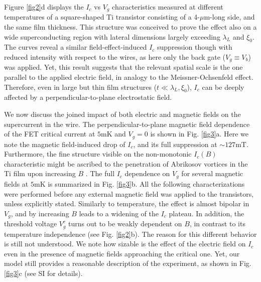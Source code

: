 \documentclass[prl,twocolumn,reprint,graphicx,showpacs,superscriptaddress,floatfix]{revtex4-1}
\begin{document}
Figure \ref{fig2}d displays the $I_c$ vs  $V_g$ characteristics measured at different  temperatures of
a square-shaped Ti transistor consisting of a 4-$\mu$m-long side, and the same film thickness. 
This structure was conceived to prove the effect also on a wide superconducting region with lateral dimensions largely exceeding $\lambda_L$ and $\xi_0$. 
The curves  reveal a similar field-effect-induced $I_c$ suppression though with reduced intensity with respect to the wires, as here only the back gate ($V_g \equiv V_b$) was applied.
Yet, this result suggests that 
the relevant spatial scale is the one parallel to the applied electric field, in analogy to the Meissner-Ochsenfeld effect. 
Therefore, even in large but thin film structures ($t\ll \lambda _L,\xi_0$), $I_c$ can be deeply affected by a perpendicular-to-plane electrostatic field.

We now discuss the joined impact of both electric and magnetic fields on the supercurrent in the wire.
The perpendicular-to-plane magnetic field dependence of the FET critical current at $5$mK and $V_g=0$ is shown in Fig. \ref{fig3}a. 
Here we note the magnetic field-induced drop of $I_c$, and its full suppression at $\sim 127$mT. 
Furthermore, the fine structure visible on the non-monotonic $I_c(B)$ characteristic might be ascribed  to the penetration of Abrikosov vortices in the Ti film upon increasing   $B$ \cite{Weber2015}. 
The full $I_c$ dependence on $V_g$ for several magnetic fields at $5$mK  is summarized in Fig. \ref{fig3}b.
All the  following characterizations were performed before any external magnetic field was applied to the transistors, unless explicitly stated.
Similarly to temperature, the effect is almost bipolar in $V_g$, and by increasing $B$ leads to a widening of the $I_c$ plateau.  
In addition, the threshold voltage $V_g^c$ turns out to be weakly dependent on $B$, in contrast to its temperature independence (see Fig. \ref{fig2}b). The reason for this different behavior is still not understood.
We note how sizable is
the effect of the electric field on  $I_c$ even in the presence of magnetic fields approaching the critical one.
Yet, our model still provides a reasonable description of the experiment, as shown in Fig. \ref{fig3}c (see SI for details).
\end{document}
